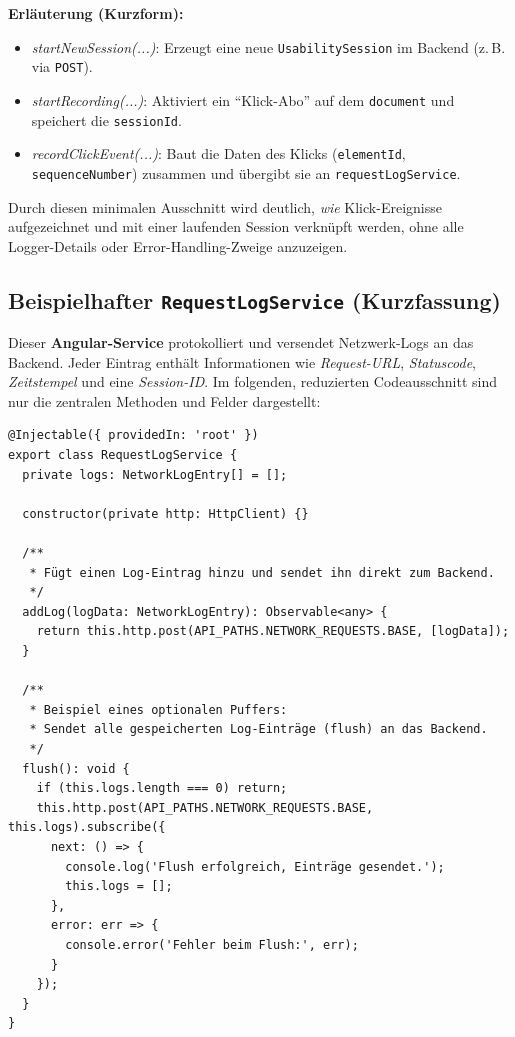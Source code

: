 \documentclass[12pt,oneside]{article}
\begin{document}
\noindent
\textbf{Erläuterung (Kurzform):}
\begin{itemize}
  \item \emph{startNewSession(...)}: Erzeugt eine neue \lstinline|UsabilitySession| im Backend (z.\,B. via \lstinline|POST|).
  \item \emph{startRecording(...)}: Aktiviert ein \enquote{Klick-Abo} auf dem \lstinline|document| und speichert die \lstinline|sessionId|.
  \item \emph{recordClickEvent(...)}: Baut die Daten des Klicks (\lstinline|elementId|, \lstinline|sequenceNumber|) zusammen und übergibt sie an \lstinline|requestLogService|.
\end{itemize}

Durch diesen minimalen Ausschnitt wird deutlich, \emph{wie} Klick-Ereignisse aufgezeichnet und mit einer laufenden Session verknüpft werden, ohne alle Logger-Details oder Error-Handling-Zweige anzuzeigen.

\subsection{Beispielhafter \lstinline|RequestLogService| (Kurzfassung)}
\label{subsec:frontend_requestlog}

Dieser \textbf{Angular-Service} protokolliert und versendet Netzwerk-Logs an das Backend. Jeder Eintrag enthält Informationen wie \emph{Request-URL}, \emph{Statuscode}, \emph{Zeitstempel} und eine \emph{Session-ID}. Im folgenden, reduzierten Codeausschnitt sind nur die zentralen Methoden und Felder dargestellt:
 
\begin{lstlisting}
@Injectable({ providedIn: 'root' })
export class RequestLogService {
  private logs: NetworkLogEntry[] = [];

  constructor(private http: HttpClient) {}

  /**
   * Fügt einen Log-Eintrag hinzu und sendet ihn direkt zum Backend.
   */
  addLog(logData: NetworkLogEntry): Observable<any> {
    return this.http.post(API_PATHS.NETWORK_REQUESTS.BASE, [logData]);
  }

  /**
   * Beispiel eines optionalen Puffers:
   * Sendet alle gespeicherten Log-Einträge (flush) an das Backend.
   */
  flush(): void {
    if (this.logs.length === 0) return;
    this.http.post(API_PATHS.NETWORK_REQUESTS.BASE, this.logs).subscribe({
      next: () => {
        console.log('Flush erfolgreich, Einträge gesendet.');
        this.logs = [];
      },
      error: err => {
        console.error('Fehler beim Flush:', err);
      }
    });
  }
}
\end{lstlisting}
\end{document}
